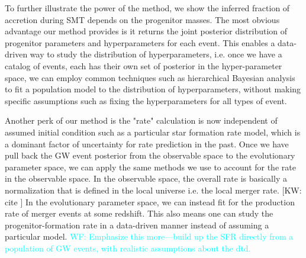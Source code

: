 \documentclass[twocolumn]{aastex631}
\newcommand{\kw}[1]{{\color{rb4}[KW: #1 ]}}
\newcommand{\wf}[1]{\textcolor{cyan}{WF: #1}}
\begin{document}
To further illustrate the power of the method, we show the inferred fraction of accretion during SMT depends on the progenitor masses.
The most obvious advantage our method provides is it returns the joint posterior distribution of progenitor parameters and hyperparameters for each event.
This enables a data-driven way to study the distribution of hyperparameters,
i.e. once we have a catalog of events, each has their own set of posterior in the hyper-parameter space,
we can employ common techniques such as hierarchical Bayesian analysis to fit a population model to the distribution of hyperparameters,
without making specific assumptions such as fixing the hyperparameters for all types of event. 

Another perk of our method is the "rate" calculation is now independent of
assumed initial condition such as a particular star formation rate model, which
is a dominant factor of uncertainty for rate prediction in the past. Once we
have pull back the GW event posterior from the observable space to the
evolutionary parameter space, we can apply the same methods we use to account
for the rate in the observable space. In the observable space, the overall rate
is basically a normalization that is defined in the local universe i.e. the
local merger rate. \kw{cite} In the evolutionary parameter space, we can instead
fit for the production rate of merger events at some redshift. This also means
one can study the progenitor-formation rate in a data-driven manner instead of
assuming a particular model. \wf{Emphasize this more---build up the SFR directly
from a population of GW events, with realistic assumptions about the dtd.}
\end{document}
